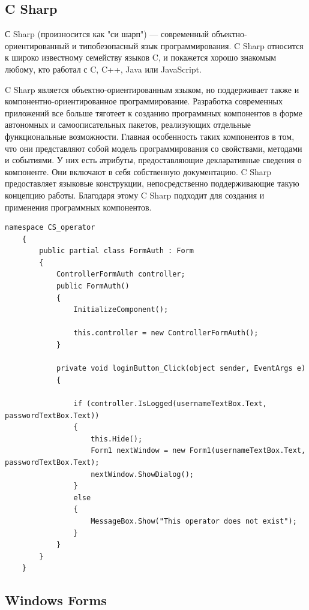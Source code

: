 \subsection{C Sharp}

\vspace{0.5cm}
\hspace{0.6cm}
С Sharp (произносится как "си шарп") — современный объектно-ориентированный и типобезопасный язык программирования. C Sharp относится к широко известному семейству языков C, и покажется хорошо знакомым любому, кто работал с C, C++, Java или JavaScript.

\vspace{0.1cm}
C Sharp является объектно-ориентированным языком, но поддерживает также и компонентно-ориентированное программирование. Разработка современных приложений все больше тяготеет к созданию программных компонентов в форме автономных и самоописательных пакетов, реализующих отдельные функциональные возможности. Главная особенность таких компонентов в том, что они представляют собой модель программирования со свойствами, методами и событиями. У них есть атрибуты, предоставляющие декларативные сведения о компоненте. Они включают в себя собственную документацию. C Sharp предоставляет языковые конструкции, непосредственно поддерживающие такую концепцию работы. Благодаря этому C Sharp подходит для создания и применения программных компонентов\cite{microsoft-csharp}.

\begin{lstlisting}[caption=Генерация фейковых адресов, label = list:pythonFakerAddresses]
	namespace CS_operator
	{
		public partial class FormAuth : Form
		{
			ControllerFormAuth controller;
			public FormAuth()
			{
				InitializeComponent();
			
				this.controller = new ControllerFormAuth();
			}
		
			private void loginButton_Click(object sender, EventArgs e)
			{
			
				if (controller.IsLogged(usernameTextBox.Text, passwordTextBox.Text))
				{
					this.Hide();
					Form1 nextWindow = new Form1(usernameTextBox.Text, passwordTextBox.Text);
					nextWindow.ShowDialog();
				}
				else
				{
					MessageBox.Show("This operator does not exist");
				}
			}
		}
	}
\end{lstlisting}

\subsection{Windows Forms}

